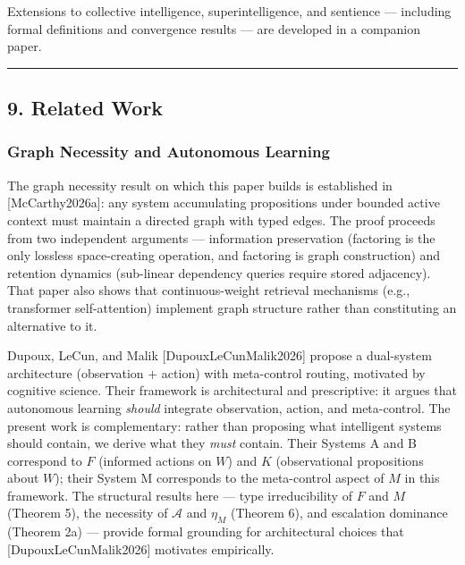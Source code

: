 \documentclass[
]{article}
\begin{document}
Extensions to collective intelligence, superintelligence, and sentience
--- including formal definitions and convergence results --- are
developed in a companion paper.

\begin{center}\rule{0.5\linewidth}{0.5pt}\end{center}

\subsection{9. Related Work}\label{related-work}

\subsubsection{Graph Necessity and Autonomous
Learning}\label{graph-necessity-and-autonomous-learning}

The graph necessity result on which this paper builds is established in
{[}McCarthy2026a{]}: any system accumulating propositions under bounded
active context must maintain a directed graph with typed edges. The
proof proceeds from two independent arguments --- information
preservation (factoring is the only lossless space-creating operation,
and factoring is graph construction) and retention dynamics (sub-linear
dependency queries require stored adjacency). That paper also shows that
continuous-weight retrieval mechanisms (e.g., transformer self-attention)
implement graph structure rather than constituting an alternative to it.

Dupoux, LeCun, and Malik {[}DupouxLeCunMalik2026{]} propose a
dual-system architecture (observation + action) with meta-control
routing, motivated by cognitive science. Their framework is
architectural and prescriptive: it argues that autonomous learning
\emph{should} integrate observation, action, and meta-control. The
present work is complementary: rather than proposing what intelligent
systems should contain, we derive what they \emph{must} contain. Their
Systems A and B correspond to \(F\) (informed actions on \(W\)) and
\(K\) (observational propositions about \(W\)); their System M
corresponds to the meta-control aspect of \(M\) in this framework. The
structural results here --- type irreducibility of \(F\) and \(M\)
(Theorem 5), the necessity of \(\mathcal{A}\) and \(\eta_M\) (Theorem
6), and escalation dominance (Theorem 2a) --- provide formal grounding
for architectural choices that {[}DupouxLeCunMalik2026{]} motivates
empirically.
\end{document}
